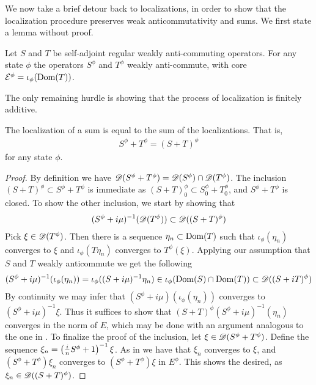 We now take a brief detour back to localizations, in order to show that the localization procedure preserves weak anticommutativity and sums. We first state a lemma without proof.
\begin{lemma}\label{locanticom}
	Let $S$ and $T$ be self-adjoint regular weakly anti-commuting operators. For any state $\phi$ the operators $S^\phi$ and $T^\phi$ weakly anti-commute, with core $\E^\phi=\iota_\phi(\dom(T))$. 
\end{lemma}
\begin{comment}
\begin{proof}
	The result follows by the since $\pi_{\omega}$ is completely contractive and a homomorphism. Thereby the localization of a shared core is again a shared core, as well as preserving domain inclusions. 
\end{proof}
\end{comment}
The only remaining hurdle is showing that the process of localization is finitely additive. 
\begin{lemma}\label{sumloc}
	The localization of a sum is equal to the sum of the localizations. That is, 
	\begin{align*}
		S^\phi+T^\phi=(S+T)^\phi
	\end{align*}
	for any state $\phi$. 
\end{lemma}
\begin{proof}
	By definition we have $\D(S^\phi+T^\phi)=\D(S^\phi)\cap \D(T^\phi)$. The inclusion $(S+T)^\phi\subset S^\phi+T^\phi$  is immediate as $(S+T)_0^\phi\subset S_0^\phi+T_0^\phi$, and $S^\phi+T^\phi$ is closed. To show the other inclusion, we start by showing that 
\begin{align*}
	(S^\phi+i\mu)^{-1}(\D(T^\phi))\subset \D((S+T)^\phi)
\end{align*}
	Pick $\xi \in \D(T^\phi)$. Then there is a sequence $\eta_n\subset \operatorname{Dom}(T)$ such that $\iota_\phi(\eta_n)$ converges to $\xi$ and $\iota_{\phi}(T\eta_n)$ converges to $T^\phi(\xi)$. Applying our assumption that $S$ and $T$ weakly anticommute we get the following
	\begin{align*}
		(S^\phi+i\mu)^{-1}(\iota_\phi(\eta_n))=\iota_\phi((S+i\mu)^{-1}\eta_n)\in \iota_\phi(\dom(S)\cap \dom(T))\subset \D((S+iT)^\phi)
	\end{align*}
	By continuity we may infer that $(S^\phi+i\mu)(\iota_\phi(\eta_n))$ converges to $(S^\phi+i\mu)^{-1}\xi$. Thus it suffices to show that $(S+T)^\phi(S^\phi+i\mu)^{-1}(\eta_n)$ converges in the norm of $E$, which may be done with an argument analogous to the one in . To finalize the proof of the inclusion, let $\xi\in \D(S^\phi+T^\phi)$. Define the sequence $\xi_n=\pa{\frac{i}{n}S^\phi+1}^{-1}\xi$. As in  we have that $\xi_n$ converges to $\xi$, and $(S^\phi+T^\phi)\xi_n$ converges to $(S^\phi+T^\phi)\xi$ in $E^\phi$. This shows the desired, as $\xi_n\in \D((S+T)^{\phi})$. 
\end{proof}
